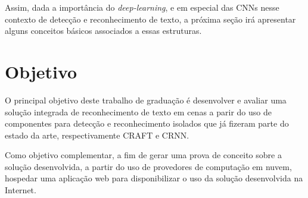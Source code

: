 Assim, dada a importância do \textit{deep-learning}, e em especial das CNNs nesse contexto de detecção e reconhecimento de texto, a próxima seção irá apresentar alguns conceitos básicos associados a essas estruturas.

\section{Objetivo}

O principal objetivo deste trabalho de graduação é desenvolver e avaliar uma solução integrada de reconhecimento de texto em cenas a parir do uso de componentes para detecção e reconhecimento isolados que já fizeram parte do estado da arte, respectivamente CRAFT e CRNN.

Como objetivo complementar, a fim de gerar uma prova de conceito sobre a solução desenvolvida, a partir do uso de provedores de computação em nuvem, hospedar uma aplicação web para disponibilizar o uso da solução desenvolvida na Internet.

